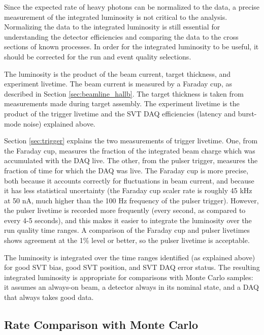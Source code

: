Since the expected rate of heavy photons can be normalized to the data, a precise measurement of the integrated luminosity is not critical to the analysis.
Normalizing the data to the integrated luminosity is still essential for understanding the detector efficiencies and comparing the data to the cross sections of known processes.
In order for the integrated luminosity to be useful, it should be corrected for the run and event quality selections.

The luminosity is the product of the beam current, target thickness, and experiment livetime.
The beam current is measured by a Faraday cup, as described in Section \ref{sec:beamline_hallb}.
The target thickness is taken from measurements made during target assembly.
The experiment livetime is the product of the trigger livetime and the SVT DAQ efficiencies (latency and burst-mode noise) explained above.

Section \ref{sec:trigger} explains the two measurements of trigger livetime.
One, from the Faraday cup, measures the fraction of the integrated beam charge which was accumulated with the DAQ live.
The other, from the pulser trigger, measures the fraction of time for which the DAQ was live.
The Faraday cup is more precise, both because it accounts correctly for fluctuations in beam current, and because it has less statistical uncertainty (the Faraday cup scaler rate is roughly 45 kHz at 50 nA, much higher than the 100 Hz frequency of the pulser trigger).
However, the pulser livetime is recorded more frequently (every second, as compared to every 4-5 seconds), and this makes it easier to integrate the luminosity over the run quality time ranges.
A comparison of the Faraday cup and pulser livetimes shows agreement at the 1\% level or better, so the pulser livetime is acceptable.

The luminosity is integrated over the time ranges identified (as explained above) for good SVT bias, good SVT position, and SVT DAQ error status.
The resulting integrated luminosity is appropriate for comparisons with Monte Carlo samples: it assumes an always-on beam, a detector always in its nominal state, and a DAQ that always takes good data.

\subsection{Rate Comparison with Monte Carlo}
\label{sec:rates}

